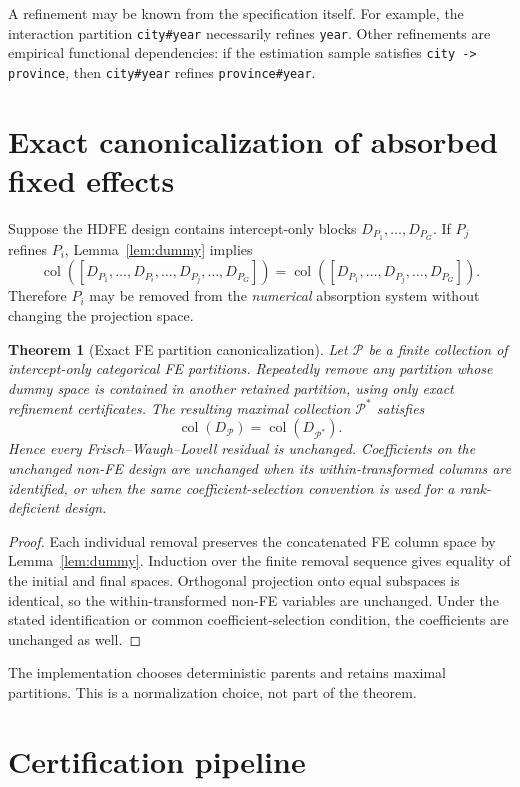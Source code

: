 \documentclass[11pt]{article}
\newtheorem{theorem}{Theorem}[section]
\theoremstyle{definition}
\newcommand{\col}{\operatorname{col}}
\newcommand{\1}{\mathbf{1}}
\begin{document}
A refinement may be known from the specification itself. For example, the interaction partition \texttt{city\#year} necessarily refines \texttt{year}. Other refinements are empirical functional dependencies: if the estimation sample satisfies \texttt{city -> province}, then \texttt{city\#year} refines \texttt{province\#year}.

\section{Exact canonicalization of absorbed fixed effects}

Suppose the HDFE design contains intercept-only blocks $D_{P_1},\dots,D_{P_G}$. If $P_j$ refines $P_i$, Lemma~\ref{lem:dummy} implies
\[
 \col([D_{P_1},\dots,D_{P_i},\dots,D_{P_j},\dots,D_{P_G}])
 =\col([D_{P_1},\dots,D_{P_j},\dots,D_{P_G}]).
\]
Therefore $P_i$ may be removed from the \emph{numerical} absorption system without changing the projection space.

\begin{theorem}[Exact FE partition canonicalization]\label{thm:canon}
Let $\mathcal P$ be a finite collection of intercept-only categorical FE partitions. Repeatedly remove any partition whose dummy space is contained in another retained partition, using only exact refinement certificates. The resulting maximal collection $\mathcal P^*$ satisfies
\[
  \col(D_{\mathcal P})=\col(D_{\mathcal P^*}).
\]
Hence every Frisch--Waugh--Lovell residual is unchanged. Coefficients on the unchanged non-FE design are unchanged when its within-transformed columns are identified, or when the same coefficient-selection convention is used for a rank-deficient design.
\end{theorem}
\begin{proof}
Each individual removal preserves the concatenated FE column space by Lemma~\ref{lem:dummy}. Induction over the finite removal sequence gives equality of the initial and final spaces. Orthogonal projection onto equal subspaces is identical, so the within-transformed non-FE variables are unchanged. Under the stated identification or common coefficient-selection condition, the coefficients are unchanged as well.
\end{proof}

The implementation chooses deterministic parents and retains maximal partitions. This is a normalization choice, not part of the theorem.

\section{Certification pipeline}
\end{document}
